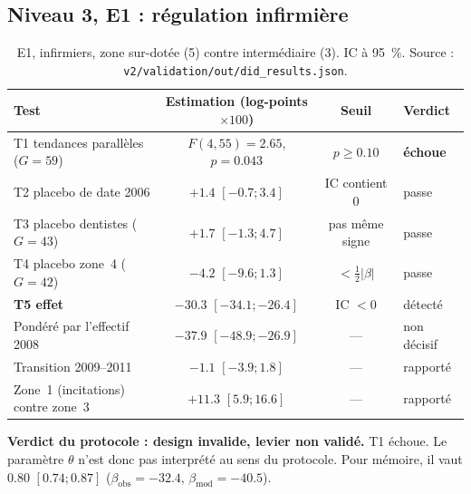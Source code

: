 \subsection{Niveau 3, E1 : régulation infirmière}
\begin{table}[h]
\centering\small
\begin{tabular}{@{}lccl@{}}
\toprule
Test & Estimation (log-points $\times 100$) & Seuil & Verdict \\
\midrule
T1 tendances parallèles ($G = 59$) & $F(4, 55) = \num{2.65}$\mesure{}, $p = \num{0.043}$\mesure{} & $p \ge \num{0.10}$ & \textbf{échoue} \\
T2 placebo de date 2006 & $+\num{1.4}$\mesure{} $[\num{-0.7} ; \num{3.4}]$ & IC contient 0 & passe \\
T3 placebo dentistes ($G = 43$) & $+\num{1.7}$\mesure{} $[\num{-1.3} ; \num{4.7}]$ & pas même signe & passe \\
T4 placebo zone~4 ($G = 42$) & $\num{-4.2}$\mesure{} $[\num{-9.6} ; \num{1.3}]$ & $< \frac12|\beta|$ & passe \\
\textbf{T5 effet} & $\mathbf{\num{-30.3}}$\mesure{} $[\num{-34.1} ; \num{-26.4}]$ & IC $< 0$ & détecté \\
\midrule
Pondéré par l'effectif 2008 & $\num{-37.9}$\mesure{} $[\num{-48.9} ; \num{-26.9}]$ & --- & non décisif \\
Transition 2009--2011 & $\num{-1.1}$\mesure{} $[\num{-3.9} ; \num{1.8}]$ & --- & rapporté \\
Zone~1 (incitations) contre zone~3 & $+\num{11.3}$\mesure{} $[\num{5.9} ; \num{16.6}]$ & --- & rapporté \\
\bottomrule
\end{tabular}
\caption{E1, infirmiers, zone sur-dotée (5) contre intermédiaire (3). IC à 95~\%. Source :
\texttt{v2/validation/out/did\_results.json}.}\label{a3-tab:e1}
\end{table}

\textbf{Verdict du protocole : design invalide, levier non validé.} T1 échoue. Le paramètre
$\theta$ n'est donc pas interprété au sens du protocole. Pour mémoire, il vaut
$\num{0.80}$\mesure{} $[\num{0.74} ; \num{0.87}]$ ($\beta_{\text{obs}} = \num{-32.4}$\mesure{},
$\beta_{\text{mod}} = \num{-40.5}$\mesure{}).

